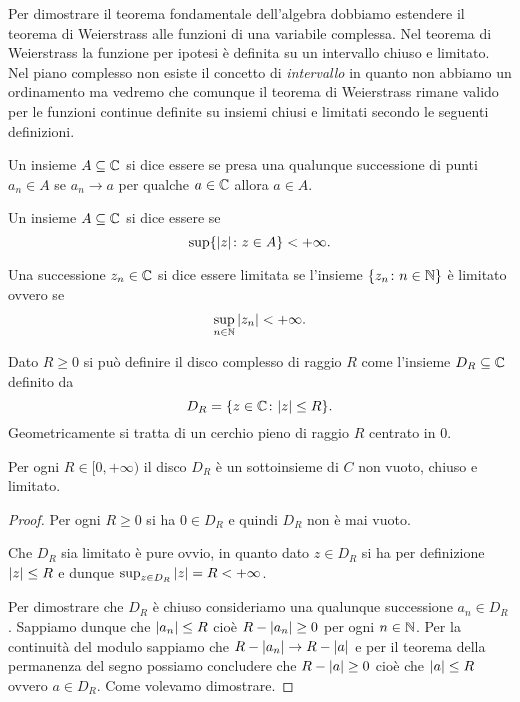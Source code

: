 Per dimostrare il teorema fondamentale dell'algebra dobbiamo estendere il teorema di Weierstrass alle funzioni di una variabile complessa.
Nel teorema di Weierstrass la funzione per ipotesi è definita su un intervallo chiuso e limitato. Nel piano complesso non esiste il concetto di \emph{intervallo} in quanto non abbiamo un ordinamento ma vedremo che comunque il teorema di Weierstrass rimane valido per le funzioni continue definite su insiemi chiusi e limitati secondo le seguenti definizioni.

\begin{definition}
Un insieme $A\subseteq \mathbb C$ si dice
essere 
se presa una qualunque successione
di punti $a_n\in A$ se $a_n \to a$ per qualche $a\in \mathbb C$
allora $a\in A$.
\end{definition}

\begin{definition}[limitatezza]
Un insieme $A\subseteq \mathbb C$ si dice essere 
se
\[
  \sup \{ {\left|z\right|}\colon z \in A\} < +\infty.
\]

Una successione $z_n\in \mathbb C$ si dice essere limitata se l'insieme
$\{z_n\colon n\in \mathbb N\}$ è limitato ovvero se
\[
  \sup_{n\in \mathbb N} {\left|z_n\right|} < +\infty.
\]
\end{definition}

\begin{definition}[disco]
Dato $R\ge 0$ si può definire il disco complesso di raggio $R$ come
l'insieme $D_R\subseteq \mathbb C$ definito da
\[
  D_R = \{z\in \mathbb C\colon {\left|z\right|} \le R\}.
\]
Geometricamente si tratta di un cerchio pieno di raggio $R$ centrato in $0$.
\end{definition}

\begin{theorem}
Per ogni $R\in [0,+\infty)$ il disco $D_R$ è un sottoinsieme di $C$ non vuoto, chiuso e limitato.
\end{theorem}
%
\begin{proof}
Per ogni $R\ge 0$ si ha $0\in D_R$ e quindi $D_R$ non è mai vuoto.

Che $D_R$ sia limitato è pure ovvio,
in quanto dato $z\in D_R$ si ha per
definizione ${\left|z\right|}\le R$ e dunque $\sup_{z\in D_R} {\left|z\right|} = R < +\infty$.

Per dimostrare che $D_R$ è chiuso consideriamo una qualunque successione $a_n \in D_R$. Sappiamo dunque che ${\left|a_n\right|} \le R$
cioè $R-{\left|a_n\right|} \ge 0$ per ogni $n\in \mathbb N$.
Per la continuità del modulo sappiamo che $R-{\left|a_n\right|}\to R-{\left|a\right|}$
e per il teorema della permanenza del segno possiamo concludere che $R-{\left|a\right|}\ge 0$ cioè che ${\left|a\right|}\le R$ ovvero $a \in D_R$. Come volevamo dimostrare.
\end{proof}

